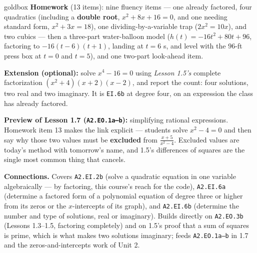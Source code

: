 \documentclass[10pt]{article}
\begin{document}
\boxguard[18]
\begin{skillbox}{goldbox}
\textbf{Homework} (13 items): nine fluency items --- one already factored, four quadratics
(including a \textbf{double root}, $x^2+8x+16=0$, and one needing standard form, $x^2+3x=18$), one
dividing-by-a-variable trap ($2x^2=10x$), and two cubics --- then a three-part water-balloon model
($h(t)=-16t^2+80t+96$, factoring to $-16(t-6)(t+1)$, landing at $t=6$ s, and level with the $96$-ft
press box at $t=0$ and $t=5$), and one two-part look-ahead item.

\textbf{Extension (optional):} solve $x^4-16=0$ using \emph{Lesson 1.5's} complete factorization
$\left(x^2+4\right)(x+2)(x-2)$, and report the count: four solutions, two real and two imaginary.
It is \texttt{EI.6b} at degree four, on an expression the class has already factored.

\textbf{Preview of Lesson 1.7 (\texttt{A2.EO.1a--b}):} simplifying rational expressions. Homework
item 13 makes the link explicit --- students solve $x^2-4=0$ and then say why those two values must
be \textbf{excluded} from $\frac{x+5}{x^2-4}$. Excluded values are today's method with tomorrow's
name, and 1.5's differences of squares are the single most common thing that cancels.

\textbf{Connections.} Covers \texttt{A2.EI.2b} (solve a quadratic equation in one variable
algebraically --- by factoring, this course's reach for the code), \texttt{A2.EI.6a} (determine a
factored form of a polynomial equation of degree three or higher from its zeros or the
$x$-intercepts of its graph), and \texttt{A2.EI.6b} (determine the number and type of solutions,
real or imaginary). Builds directly on \texttt{A2.EO.3b} (Lessons 1.3--1.5, factoring completely)
and on 1.5's proof that a sum of squares is prime, which is what makes two solutions imaginary;
feeds \texttt{A2.EO.1a--b} in 1.7 and the zeros-and-intercepts work of Unit 2.
\end{skillbox}
\end{document}
